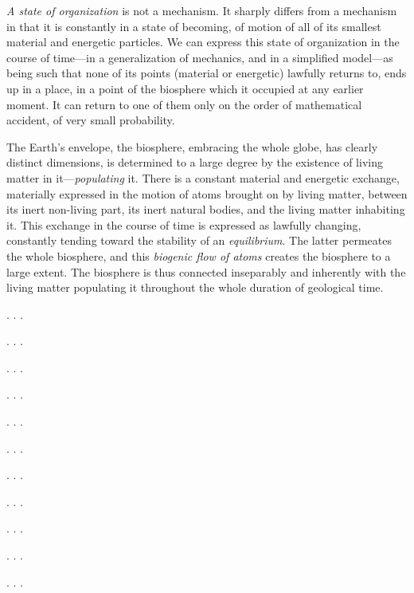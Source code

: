 \emph{A state of organization} is not a mechanism.  It sharply differs from a
mechanism in that it is constantly in a state of
becoming, of motion of
all of its smallest material and energetic particles.  We can express this
state of organization in the course of time---in a generalization of mechanics,
and in a simplified model---as being such that none of its points (material or
energetic) lawfully returns to, ends up in a place, in a point of the biosphere
which it occupied at any earlier moment.  It can return to one of them only on
the order of mathematical accident, of very small probability.

The Earth's envelope, the biosphere, embracing the whole globe, has clearly
distinct dimensions, is determined to a large degree by the existence of living
matter in it---\emph{populating} it.  There is a
constant material and energetic exchange, materially expressed in the motion of
atoms brought on by living matter, between its inert non-living part, its inert
natural bodies, and the living matter inhabiting it.  This exchange in the
course of time is expressed as lawfully changing, constantly tending toward the
stability of an \emph{equilibrium}.  The latter
permeates the whole biosphere, and this \emph{biogenic flow of
atoms} creates the biosphere to a large
extent.  The biosphere is thus connected inseparably and inherently with the
living matter populating it throughout the whole duration of geological time.

. . .

\Section %

. . .

\Section %

. . .

\Section \label{sec:6} %

. . .

\Section %

. . .

\Section %

. . .

\Section %

. . .

\Section %

. . .

\Section %

. . .

\Section %

. . .

\Section %

. . .
